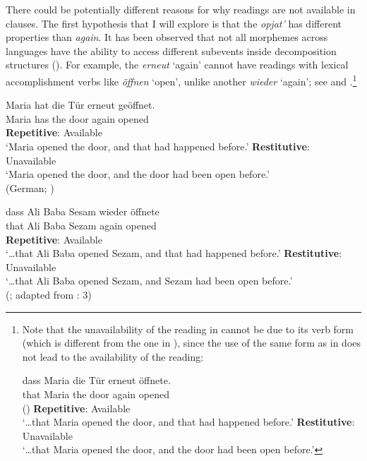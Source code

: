 \documentclass[output=paper]{langscibook}
\begin{document}
There could be potentially different reasons for why  readings are not available in   clauses. The first hypothesis that I will explore is that the    \textit{opjat’} has different properties than  \textit{again}. It has been observed that not all  morphemes across languages have the ability to access different subevents inside decomposition structures (\citealt{Rapp-vonStechow1999,Beck2005,Alexiadou-etal2014,Lechner-etal2015}). For example, the    \textit{erneut} ‘again’ cannot have  readings with lexical accomplishment verbs like \textit{öffnen} ‘open’, unlike another   \textit{wieder} ‘again’; see  and .\footnote{Note that the unavailability of the  reading in  cannot be due to its verb form (which is different from the one in ), since the use of the same form as in  does not lead to the availability of the  reading:

\ea\label{ex:bondarenko:fn7exi}
\gll {\dots} dass Maria die Tür erneut öffnete.\\
{} that Maria the door again opened \\\hfill ()
\ea     \textbf{Repetitive}: Available\\
`\dots that Maria opened the door, and that had happened before.'
\ex     \textbf{Restitutive}: Unavailable\\
`\dots that Maria opened the door, and the door had been open before.'
\z
\z
}


 \ea\label{ex:bondarenko:13}
\gll Maria hat die Tür erneut geöffnet.\\
     Maria has the door again opened\\
\ea \textbf{Repetitive}: Available\\
`Maria opened the door, and that had happened before.'
\ex \textbf{Restitutive}: Unavailable\\
`Maria opened the door, and the door had been open before.'\\
\hfill({German}; \citealt[12]{Beck2005})
\z
\z

 \ea\label{ex:bondarenko:14}
\gll {\dots} dass Ali Baba Sesam wieder öffnete\\
    {} that Ali Baba Sezam again opened\\
\ea \textbf{Repetitive}: Available\\
`\dots that Ali Baba opened Sezam, and that had happened before.'
\ex \textbf{Restitutive}: Unavailable\\
`\dots that Ali Baba opened Sezam, and Sezam had been open before.'\\
\hfill (; adapted from \citealt{vonStechow1996}: 3)
\z
\z
\end{document}
